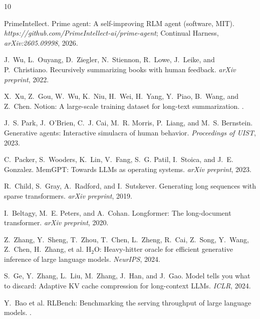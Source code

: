 \documentclass{article}
\begin{document}
\begin{thebibliography}{10}

PrimeIntellect.
\newblock Prime agent: A self-improving RLM agent (software, MIT).
\newblock \emph{https://github.com/PrimeIntellect-ai/prime-agent}; Continual Harness,
\newblock \emph{arXiv:2605.09998}, 2026.

J.~Wu, L.~Ouyang, D.~Ziegler, N.~Stiennon, R.~Lowe, J.~Leike, and P.~Christiano.
\newblock Recursively summarizing books with human feedback.
\newblock \emph{arXiv preprint}, 2022.

X.~Xu, Z.~Gou, W.~Wu, K.~Niu, H.~Wei, H.~Yang, Y.~Piao, B.~Wang, and Z.~Chen.
\newblock Notion: A large-scale training dataset for long-text summarization.
.

J.~S. Park, J.~O'Brien, C.~J. Cai, M.~R. Morris, P.~Liang, and M.~S. Bernstein.
\newblock Generative agents: Interactive simulacra of human behavior.
\newblock \emph{Proceedings of UIST}, 2023.

C.~Packer, S.~Wooders, K.~Lin, V.~Fang, S.~G. Patil, I.~Stoica, and J.~E. Gonzalez.
\newblock MemGPT: Towards LLMs as operating systems.
\newblock \emph{arXiv preprint}, 2023.

R.~Child, S.~Gray, A.~Radford, and I.~Sutskever.
\newblock Generating long sequences with sparse transformers.
\newblock \emph{arXiv preprint}, 2019.

I.~Beltagy, M.~E. Peters, and A.~Cohan.
\newblock Longformer: The long-document transformer.
\newblock \emph{arXiv preprint}, 2020.

Z.~Zhang, Y.~Sheng, T.~Zhou, T.~Chen, L.~Zheng, R.~Cai, Z.~Song, Y.~Wang, Z.~Chen,
H.~Zhang, et al.
\newblock H$_2$O: Heavy-hitter oracle for efficient generative inference of large
language models.
\newblock \emph{NeurIPS}, 2024.

S.~Ge, Y.~Zhang, L.~Liu, M.~Zhang, J.~Han, and J.~Gao.
\newblock Model tells you what to discard: Adaptive KV cache compression for
long-context LLMs.
\newblock \emph{ICLR}, 2024.

Y.~Bao et al.
\newblock RLBench: Benchmarking the serving throughput of large language models.
.

\end{thebibliography}
\end{document}
